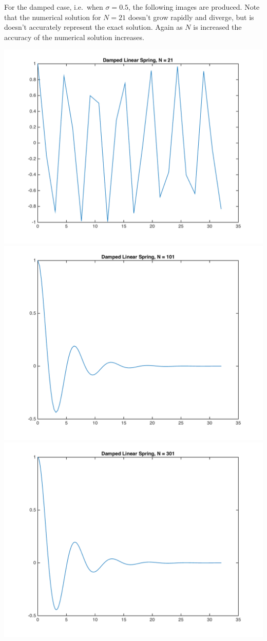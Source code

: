 \documentclass[11pt, oneside]{article}
\begin{document}
\begin{enumerate}
      For the damped case, i.e.\ when $\sigma = 0.5$, the following images are
      produced.
      Note that the numerical solution for $N = 21$ doesn't grow rapidly
      and diverge, but is doesn't accurately represent the exact solution.
      Again as $N$ is increased the accuracy of the numerical solution increases.
      \begin{center}
        \includegraphics[scale=.4]{Figures/01_06.png}
        \includegraphics[scale=.4]{Figures/01_07.png}
        \includegraphics[scale=.4]{Figures/01_08.png}

\end{center}
\end{enumerate}
\end{document}
